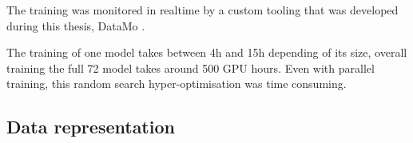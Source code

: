 \documentclass[../main.tex]{subfiles}
\begin{document}
The training was monitored in realtime by a custom tooling that was developed during this thesis, DataMo \cite{tigri_leonard-imbertdatamo_2024}.

The training of one model takes between 4h and 15h depending of its size, overall training the full 72 model takes around 500 GPU hours. Even with parallel training, this random search hyper-optimisation was time consuming.



\subsection{Data representation}
\label{sec:jcnn:data}
\end{document}
